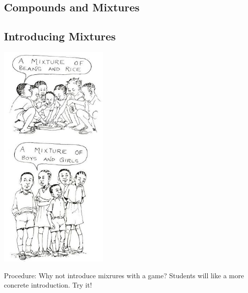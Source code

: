 \begin{multicols}{2}
\vfill
\columnbreak


\section*{Compounds and Mixtures}  


\subsection{Introducing Mixtures}

\begin{center}
\includegraphics[width=0.4\textwidth]{./img/source/intro-mixtures.jpg}
\end{center}

\begin{description*}
\item[Procedure:]{Why not introduce mixrures with a
game? Students will like a more concrete
introduction. Try it!}
\end{description*}


\end{multicols}
